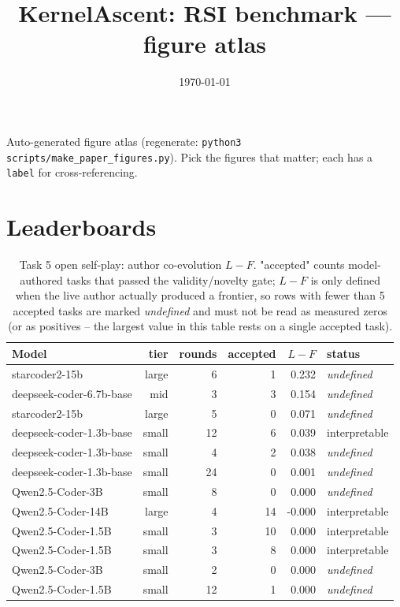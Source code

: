 \documentclass[11pt]{article}
\title{KernelAscent: RSI benchmark --- figure atlas}
\author{}
\date{\today}
\begin{document}
\maketitle
\noindent Auto-generated figure atlas (regenerate: \texttt{python3 scripts/make\_paper\_figures.py}). Pick the figures that matter; each has a \texttt{label} for cross-referencing.\par
\section{Leaderboards}
\begin{table}[H]\centering
\begin{tabular}{lrrrrl}
\toprule
Model & tier & rounds & accepted & $L-F$ & status \\
\midrule
starcoder2-15b & large & 6 & 1 & 0.232 & \emph{undefined} \\
deepseek-coder-6.7b-base & mid & 3 & 3 & 0.154 & \emph{undefined} \\
starcoder2-15b & large & 5 & 0 & 0.071 & \emph{undefined} \\
deepseek-coder-1.3b-base & small & 12 & 6 & 0.039 & interpretable \\
deepseek-coder-1.3b-base & small & 4 & 2 & 0.038 & \emph{undefined} \\
deepseek-coder-1.3b-base & small & 24 & 0 & 0.001 & \emph{undefined} \\
Qwen2.5-Coder-3B & small & 8 & 0 & 0.000 & \emph{undefined} \\
Qwen2.5-Coder-14B & large & 4 & 14 & -0.000 & interpretable \\
Qwen2.5-Coder-1.5B & small & 3 & 10 & 0.000 & interpretable \\
Qwen2.5-Coder-1.5B & small & 3 & 8 & 0.000 & interpretable \\
Qwen2.5-Coder-3B & small & 2 & 0 & 0.000 & \emph{undefined} \\
Qwen2.5-Coder-1.5B & small & 12 & 1 & 0.000 & \emph{undefined} \\
\bottomrule
\end{tabular}
\caption{Task 5 open self-play: author co-evolution $L-F$. "accepted" counts model-authored tasks that passed the validity/novelty gate; $L-F$ is only defined when the live author actually produced a frontier, so rows with fewer than 5 accepted tasks are marked \emph{undefined} and must not be read as measured zeros (or as positives -- the largest value in this table rests on a single accepted task).}
\label{tab:t5}
\end{table}
\end{document}
